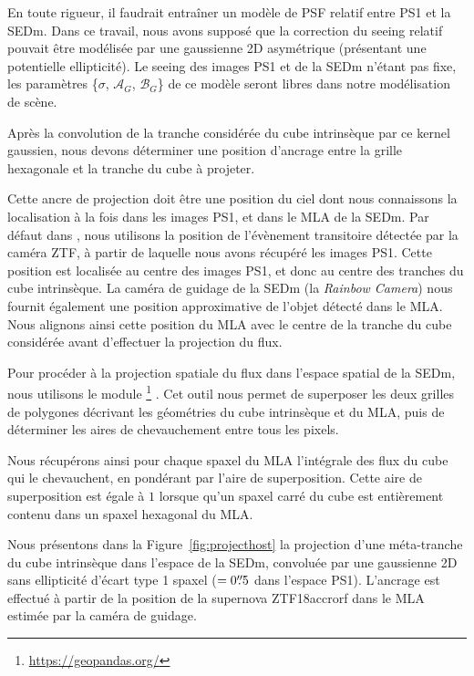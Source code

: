 \documentclass[../main/main.tex]{subfiles}
\begin{document}
En toute rigueur, il faudrait entraîner un modèle de PSF relatif entre
PS1 et la SEDm. Dans ce travail, nous avons supposé que la correction du
seeing relatif pouvait être modélisée par une gaussienne 2D asymétrique
(présentant une potentielle ellipticité). Le seeing des images PS1 et
de la SEDm n'étant pas fixe, les paramètres \{$\sigma$,
$\mathcal{A}_{G}$, $\mathcal{B}_{G}$\} de ce modèle seront libres
dans notre modélisation de scène.

Après la convolution de la tranche considérée du cube intrinsèque par ce
kernel gaussien, nous devons déterminer une position d'ancrage entre la
grille hexagonale et la tranche du cube à projeter.

Cette ancre de projection doit être une position du ciel dont nous
connaissons la localisation à la fois dans les images PS1, et dans le
MLA de la SEDm. Par défaut dans \hypergal, nous utilisons la position
de l'évènement transitoire détectée par la caméra ZTF, à partir de
laquelle nous avons récupéré les images PS1. Cette position est
localisée au centre des images PS1, et donc au centre des tranches du
cube intrinsèque. La caméra de guidage de la
SEDm (la \textit{Rainbow Camera}) nous fournit également une position
approximative de l'objet détecté dans le MLA.
Nous alignons ainsi cette position du MLA avec le centre de la tranche
du cube considérée avant d'effectuer la projection du flux.

Pour procéder à la projection spatiale du flux dans l'espace spatial de la SEDm,
nous utilisons le module
\footnote{\url{https://geopandas.org/}}
\citep{kelsey_jordahl_2020_3946761}.
Cet outil nous permet de superposer les deux grilles de polygones
décrivant les géométries du cube intrinsèque et du MLA, puis de
déterminer les aires de chevauchement entre tous les pixels. 

Nous récupérons ainsi pour chaque spaxel du MLA l'intégrale des flux
du cube qui le chevauchent, en pondérant
par l'aire de superposition. Cette aire de superposition est égale à $1$
lorsque qu'un spaxel carré du cube est entièrement contenu dans un spaxel
hexagonal du MLA.

Nous présentons dans la Figure~\ref{fig:projecthost} la projection d'une
méta-tranche du cube intrinsèque dans l'espace de la SEDm, convoluée par
une gaussienne 2D sans ellipticité d'écart type 1 spaxel ($=0\overset{\prime\prime}{.}5$
dans l'espace PS1). L'ancrage est effectué à
partir de la position de la supernova ZTF18accrorf dans le MLA estimée
par la caméra de guidage. 
\end{document}
